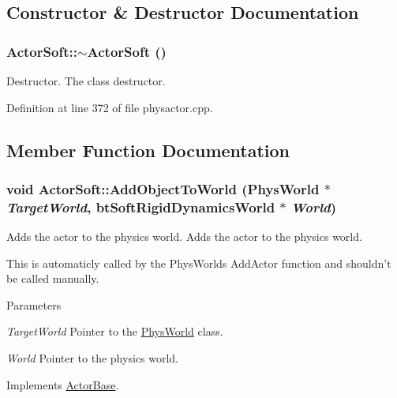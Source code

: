 \subsection{Constructor \& Destructor Documentation}
\hypertarget{classActorSoft_af58881c064fa2182a2347eb8755696b0}{
\subsubsection[{$\sim$ActorSoft}]{\setlength{\rightskip}{0pt plus 5cm}ActorSoft::$\sim$ActorSoft ()}}
\label{d5/da4/classActorSoft_af58881c064fa2182a2347eb8755696b0}


Destructor. The class destructor. 

Definition at line 372 of file physactor.cpp.

\subsection{Member Function Documentation}
\hypertarget{classActorSoft_a0def29f28ed4d126a0634ddc97e33e2f}{
\subsubsection[{AddObjectToWorld}]{\setlength{\rightskip}{0pt plus 5cm}void ActorSoft::AddObjectToWorld ({\bf PhysWorld} $\ast$ {\em TargetWorld}, \/  btSoftRigidDynamicsWorld $\ast$ {\em World})}}
\label{d5/da4/classActorSoft_a0def29f28ed4d126a0634ddc97e33e2f}


Adds the actor to the physics world. Adds the actor to the physics world. \par
 This is automaticly called by the PhysWorlds AddActor function and shouldn't be called manually. 
\begin{DoxyParams}{Parameters}
\item[{\em TargetWorld}]Pointer to the \hyperlink{classPhysWorld}{PhysWorld} class. \item[{\em World}]Pointer to the physics world. \end{DoxyParams}


Implements \hyperlink{classActorBase_a1af82a2ed960fd114518fdf84d5ff146}{ActorBase}.

